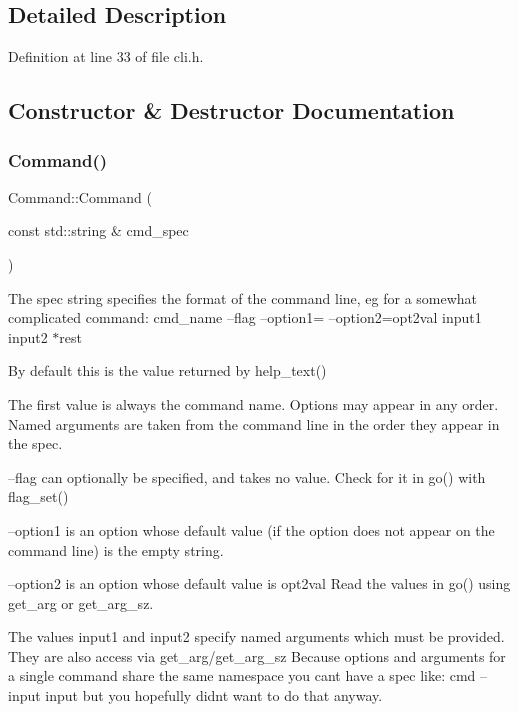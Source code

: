 \subsection{Detailed Description}


Definition at line 33 of file cli.\+h.



\subsection{Constructor \& Destructor Documentation}
\mbox{\label{class_botan___c_l_i_1_1_command_add9ddc955a88a37b3b7e278c44341b0d}} 
\subsubsection{\texorpdfstring{Command()}{Command()}}
{\footnotesize\ttfamily Command\+::\+Command (\begin{DoxyParamCaption}\item[{const std\+::string \&}]{cmd\+\_\+spec }\end{DoxyParamCaption})\hspace{0.3cm}{\ttfamily [explicit]}}

The spec string specifies the format of the command line, eg for a somewhat complicated command\+: cmd\+\_\+name --flag --option1= --option2=opt2val input1 input2 $\ast$rest

By default this is the value returned by help\+\_\+text()

The first value is always the command name. Options may appear in any order. Named arguments are taken from the command line in the order they appear in the spec.

--flag can optionally be specified, and takes no value. Check for it in go() with flag\+\_\+set()

--option1 is an option whose default value (if the option does not appear on the command line) is the empty string.

--option2 is an option whose default value is opt2val Read the values in go() using get\+\_\+arg or get\+\_\+arg\+\_\+sz.

The values input1 and input2 specify named arguments which must be provided. They are also access via get\+\_\+arg/get\+\_\+arg\+\_\+sz Because options and arguments for a single command share the same namespace you can\textquotesingle{}t have a spec like\+: cmd --input input but you hopefully didn\textquotesingle{}t want to do that anyway.

